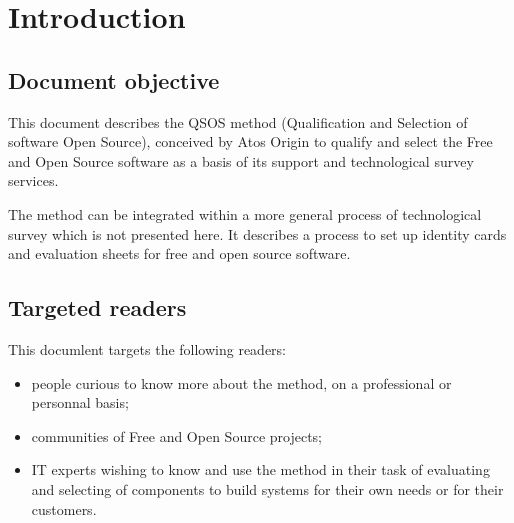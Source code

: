 %
\section{Introduction}

\subsection{Document objective}
This document describes the QSOS method (Qualification and Selection of software Open Source), conceived by Atos Origin to qualify and select the Free and Open Source software as a basis of its support and technological survey services.

The method can be integrated within a more general process of technological survey which is not presented here. It describes a process to set up identity cards and evaluation sheets for free and open source software.

\subsection{Targeted readers}
This documlent targets the following readers:
\begin{itemize}
\item people curious to know more about the method, on a professional or personnal basis;
\item communities of Free and Open Source projects;
\item IT experts wishing to know and use the method in their task of evaluating and selecting of components to build systems for their own needs or for their customers.
\end{itemize}


